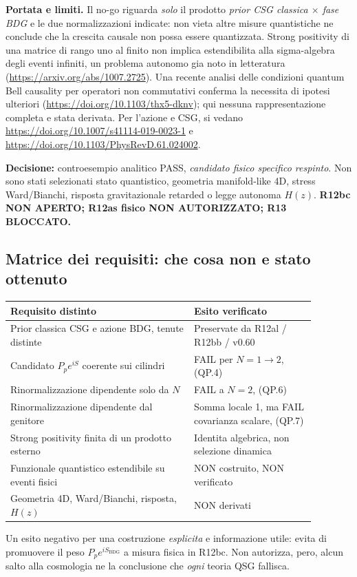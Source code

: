 \documentclass[11pt,a4paper]{article}
\begin{document}
\textbf{Portata e limiti.} Il no-go riguarda \emph{solo} il prodotto \emph{prior CSG classica $\times$ fase BDG} e le due normalizzazioni indicate: non vieta altre misure quantistiche ne conclude che la crescita causale non possa essere quantizzata. Strong positivity di una matrice di rango uno al finito non implica estendibilita alla sigma-algebra degli eventi infiniti, un problema autonomo gia noto in letteratura (\url{https://arxiv.org/abs/1007.2725}). Una recente analisi delle condizioni quantum Bell causality per operatori non commutativi conferma la necessita di ipotesi ulteriori (\url{https://doi.org/10.1103/thx5-dknv}); qui nessuna rappresentazione completa e stata derivata. Per l'azione e CSG, si vedano \url{https://doi.org/10.1007/s41114-019-0023-1} e \url{https://doi.org/10.1103/PhysRevD.61.024002}.

\textbf{Decisione:} controesempio analitico PASS, \emph{candidato fisico specifico respinto}. Non sono stati selezionati stato quantistico, geometria manifold-like 4D, stress Ward/Bianchi, risposta gravitazionale retarded o legge autonoma $H(z)$. \textbf{R12bc NON APERTO; R12as fisico NON AUTORIZZATO; R13 BLOCCATO.}


\subsection*{Matrice dei requisiti: che cosa non e stato ottenuto}
\begin{center}
\small
\begin{tabular}{p{0.53\linewidth}p{0.35\linewidth}}
\toprule
\textbf{Requisito distinto} & \textbf{Esito verificato}\\
\midrule
Prior classica CSG e azione BDG, tenute distinte & Preservate da R12al / R12bb / v0.60\\
Candidato $P_p e^{iS}$ coerente sui cilindri & FAIL per $N=1\to2$, (QP.4)\\
Rinormalizzazione dipendente solo da $N$ & FAIL a $N=2$, (QP.6)\\
Rinormalizzazione dipendente dal genitore & Somma locale 1, ma FAIL covarianza scalare, (QP.7)\\
Strong positivity finita di un prodotto esterno & Identita algebrica, non selezione dinamica\\
Funzionale quantistico estendibile su eventi fisici & NON costruito, NON verificato\\
Geometria 4D, Ward/Bianchi, risposta, $H(z)$ & NON derivati\\
\bottomrule
\end{tabular}
\end{center}
Un esito negativo per una costruzione \emph{esplicita} e informazione utile: evita di promuovere il peso $P_pe^{iS_{\mathrm{BDG}}}$ a misura fisica in R12bc. Non autorizza, pero, alcun salto alla cosmologia ne la conclusione che \emph{ogni} teoria QSG fallisca.
\end{document}
